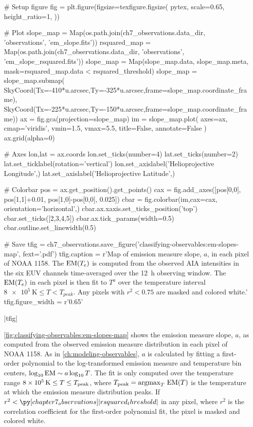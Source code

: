 \begin{pycode}
# Setup figure
fig = plt.figure(figsize=texfigure.figsize(
    pytex,
    scale=0.65,
    height_ratio=1,
))

# Plot
slope_map = Map(os.path.join(ch7_observations.data_dir, 'observations', 'em_slope.fits'))
rsquared_map = Map(os.path.join(ch7_observations.data_dir, 'observations', 'em_slope_rsquared.fits'))
slope_map = Map(slope_map.data, slope_map.meta, mask=rsquared_map.data < rsquared_threshold)
slope_map = slope_map.submap(
    SkyCoord(Tx=-410*u.arcsec,Ty=-325*u.arcsec,frame=slope_map.coordinate_frame),
    SkyCoord(Tx=-225*u.arcsec,Ty=-150*u.arcsec,frame=slope_map.coordinate_frame))
ax = fig.gca(projection=slope_map)
im = slope_map.plot(
    axes=ax,
    cmap='viridis',
    vmin=1.5,
    vmax=5.5,
    title=False,
    annotate=False
)
ax.grid(alpha=0)

# Axes
lon,lat = ax.coords
lon.set_ticks(number=4)
lat.set_ticks(number=2)
lat.set_ticklabel(rotation='vertical')
lon.set_axislabel('Helioprojective Longitude',)
lat.set_axislabel('Helioprojective Latitude',)

# Colorbar
pos = ax.get_position().get_points()
cax = fig.add_axes([pos[0,0], pos[1,1]+0.01, pos[1,0]-pos[0,0], 0.025])
cbar = fig.colorbar(im,cax=cax, orientation='horizontal',)
cbar.ax.xaxis.set_ticks_position('top')
cbar.set_ticks([2,3,4,5])
cbar.ax.tick_params(width=0.5)
cbar.outline.set_linewidth(0.5)

# Save
tfig = ch7_observations.save_figure('classifying-observables:em-slopes-map', fext='.pdf')
tfig.caption = r'Map of emission measure slope, $a$, in each pixel of \AR{} NOAA 1158. The $\textup{EM}(T_e)$ is computed from the observed AIA intensities in the six EUV channels time-averaged over the \SI{12}{\hour} observing window. The $\textup{EM}(T_e)$ in each pixel is then fit to $T^a$ over the temperature interval $\SI{8e5}{\kelvin}\le T < T_{peak}$. Any pixels with $r^2<0.75$ are masked and colored white.'
tfig.figure_width = r'0.65\textwidth'
\end{pycode}
|tfig|

\autoref{fig:classifying-observables:em-slopes-map} shows the emission measure slope, $a$, as computed from the observed emission measure distribution in each pixel of \AR{} NOAA 1158. As in \autoref{ch:modeling-observables}, $a$ is calculated by fitting a first-order polynomial to the log-transformed emission measure and temperature bin centers, $\log_{10}\textup{EM}\sim a\log_{10}T$. The fit is only computed over the temperature range $\SI{8e5}{\kelvin}\le T \le T_\textup{peak}$, where $T_\textup{peak}=\operatorname*{argmax}_T\,\textup{EM}(T)$ is the temperature at which the emission measure distribution peaks. If $r^2<\py[chapter7_observations]|rsquared_threshold|$ in any pixel, where $r^2$ is the correlation coefficient for the first-order polynomial fit, the pixel is masked and colored white. 

